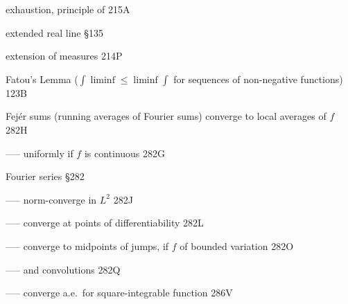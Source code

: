 \indexmedskip































exhaustion, principle of 215A

extended real line \S135

extension of measures 214P













\indexmedskip

Fatou's Lemma ($\int\liminf\le\liminf\int$
for sequences of non-negative functions) 123B




Fej\'er sums (running averages of Fourier sums)
converge to local averages of $f$ 282H


----- uniformly if $f$ is continuous 282G






















Fourier series \S282

----- norm-converge in $L^2$ 282J

----- converge at points of differentiability 282L

----- converge to midpoints of jumps,
if $f$ of bounded variation 282O


----- and convolutions 282Q

----- converge a.e.\ for square-integrable function 286V

